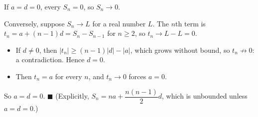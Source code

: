 If $a=d=0$, every $S_n=0$, so $S_n\to0$.

Conversely, suppose $S_n\to L$ for a real number $L$. The $n$th term is $t_n=a+(n-1)d=S_n-S_{n-1}$ for $n\ge2$, so $t_n\to L-L=0$.
\begin{itemize}
\item If $d\ne0$, then $|t_n|\ge(n-1)|d|-|a|$, which grows without bound, so $t_n\not\to0$: a contradiction. Hence $d=0$.
\item Then $t_n=a$ for every $n$, and $t_n\to0$ forces $a=0$.
\end{itemize}
So $a=d=0$. $\blacksquare$ (Explicitly, $S_n=na+\dfrac{n(n-1)}{2}d$, which is unbounded unless $a=d=0$.)
